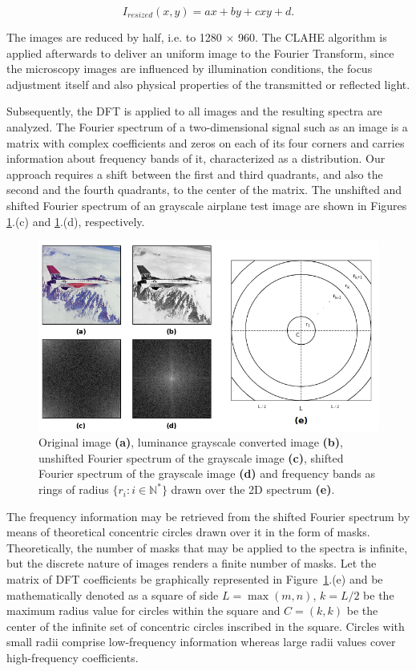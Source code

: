 \begin{equation}
\label{eqn:bilinear_interpolation}
I_{resized}(x,y) = ax + by + cxy + d.
\end{equation}

The images are reduced by half, i.e. to 1280 $\times$ 960. The CLAHE algorithm is applied afterwards to deliver an uniform image to the Fourier Transform, since the microscopy images are influenced by illumination conditions, the focus adjustment itself and also physical properties of the transmitted or reflected light.

Subsequently, the DFT is applied to all images and the resulting spectra are analyzed. The Fourier spectrum of a two-dimensional signal such as an image is a matrix with complex coefficients and zeros on each of its four corners and carries information about frequency bands of it, characterized as a distribution. Our approach requires a shift between the first and third quadrants, and also the second and the fourth quadrants, to the center of the matrix. The unshifted and shifted Fourier spectrum of an grayscale airplane test image are shown in Figures \ref{fig:fourier_spectrum}.(c) and \ref{fig:fourier_spectrum}.(d), respectively. 

\begin{figure}[ht]
	\centering
	\caption{Original image \textbf{(a)}, luminance grayscale converted image \textbf{(b)}, unshifted Fourier spectrum of the grayscale image \textbf{(c)}, shifted Fourier spectrum of the grayscale image \textbf{(d)} and frequency bands as rings of radius $\{r_{i}: i\in\mathbb{N}^{*}\}$ drawn over the 2D spectrum \textbf{(e)}.}
	\label{fig:fourier_spectrum}
	\includegraphics[scale=0.6]{images/fourier_spectrum.png}
	\centering
	\fautor
\end{figure}

The frequency information may be retrieved from the shifted Fourier spectrum by means of theoretical concentric circles drawn over it in the form of masks. Theoretically, the number of masks that may be applied to the spectra is infinite, but the discrete nature of images renders a finite number of masks. Let the matrix of DFT coefficients be graphically represented in Figure~\ref{fig:fourier_spectrum}.(e) and be mathematically denoted as a square of side $L = \max{(m,n)}$, $k = L / 2$ be the maximum radius value for circles within the square and $C = (k,k)$ be the center of the infinite set of concentric circles inscribed in the square. Circles with small radii comprise low-frequency information whereas large radii values cover high-frequency coefficients.

